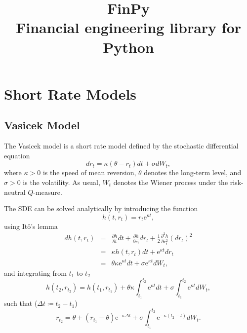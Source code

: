 \documentclass{report}
\title{FinPy \\[0.4cm] \Large Financial engineering library for Python}
\newcommand{\e}{\text{e}}
\begin{document}
\maketitle

\tableofcontents



\appendix

\chapter{Short Rate Models}

\section{Vasicek Model}
The Vasicek model \cite{Vasicek1977} is a short rate model defined by the stochastic differential equation 
\begin{equation}
dr_t = \kappa \left( \theta - r_t \right) dt + \sigma dW_t,
\end{equation}
where $\kappa > 0$ is the speed of mean reversion, $\theta$ denotes the long-term level, and $\sigma > 0$ is the volatility.
As usual, $W_t$ denotes the Wiener process under the risk-neutral $Q$-measure.

The SDE can be solved analytically by introducing the function
\begin{equation}
h(t, r_t) = r_t \e^{\kappa t},
\end{equation}
using It\^{o}'s lemma
\begin{eqnarray}
dh(t, r_t) &=& \frac{\partial h}{\partial t} dt + \frac{\partial h}{\partial r_t} dr_t + \frac{1}{2}\frac{\partial^2 h}{\partial r_t^2} \left(dr_t\right)^2 \\
&=& \kappa h(t, r_t) dt + \e^{\kappa t} dr_t \\
&=& \theta \kappa \e^{\kappa t} dt + \sigma \e^{\kappa t} dW_t,
\end{eqnarray}
and integrating from $t_1$ to $t_2$
\begin{equation}
h(t_2, r_{t_2}) = h(t_1, r_{t_1}) + \theta \kappa \int_{t_1}^{t_2} \e^{\kappa t} dt + \sigma \int_{t_1}^{t_2} \e^{\kappa t} dW_t,
\end{equation}
such that ($\Delta t \coloneq t_2 - t_1$)
\begin{equation}
r_{t_2} = \theta + \left( r_{t_1} - \theta \right) \e^{-\kappa \Delta t} + \sigma \int_{t_1}^{t_2} \e^{-\kappa \left(t_2 - t\right)} dW_t.
\end{equation}
\end{document}
